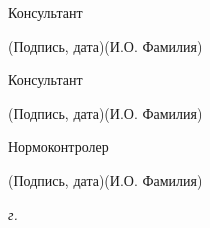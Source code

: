\documentclass[14pt, russian]{scrartcl}
\begin{document}
\begin{titlepage}
\noindent Консультант \hfill \underline{\hspace{4cm}}\quad
\underline{\hspace{4cm}}

\vspace{-2ex}
\noindent\hspace{13.5ex}\normalsize\hspace{170pt}\hspace{2ex}\scriptsize{(Подпись, дата)}\normalsize\hspace{30pt}\hspace{6ex}\scriptsize{(И.О. Фамилия)}\normalsize
\bigskip

\noindent Консультант \hfill \underline{\hspace{4cm}}\quad
\underline{\hspace{4cm}}

\vspace{-2ex}
\noindent\hspace{13.5ex}\normalsize\hspace{170pt}\hspace{2ex}\scriptsize{(Подпись, дата)}\normalsize\hspace{30pt}\hspace{6ex}\scriptsize{(И.О. Фамилия)}\normalsize

\bigskip

\noindent Нормоконтролер \hfill \underline{\hspace{4cm}}\quad
\underline{\hspace{4cm}}

\vspace{-2ex}
\noindent\hspace{13.5ex}\normalsize\hspace{170pt}\hspace{2ex}\scriptsize{(Подпись, дата)}\normalsize\hspace{30pt}\hspace{6ex}\scriptsize{(И.О. Фамилия)}\normalsize
\vfill

 


\begin{center}
\textsl{\the\year{} г.}
\end{center}
\end{titlepage}


\setlength{\tabcolsep}{3pt}
\newpage
\setcounter{page}{2}
\end{document}
